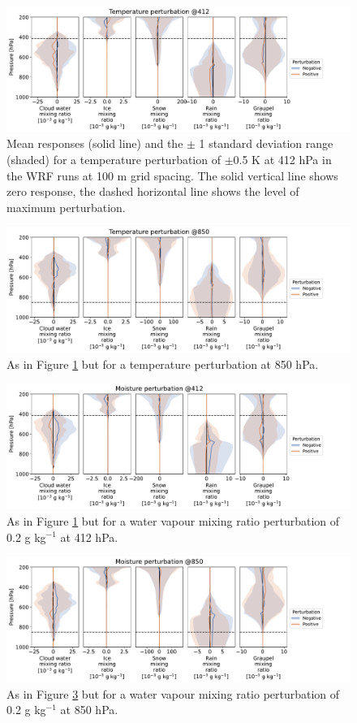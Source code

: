 \documentclass[draft]{agujournal2019}
\begin{document}
\begin{figure}[pth]
    \noindent\includegraphics[width=\textwidth]{figures/pert_var_T_0.5_@412}
    \caption{Mean responses (solid line) and the $\pm$ 1 standard deviation range (shaded) for a temperature perturbation of $\pm$0.5 K at 412 hPa in the WRF runs at 100 m grid spacing. The solid vertical line shows zero response, the dashed horizontal line shows the level of maximum perturbation.}
    \label{fig:var_T_412}
\end{figure}

\begin{figure}[pth]
    \noindent\includegraphics[width=\textwidth]{figures/pert_var_T_0.5_@850}
    \caption{As in Figure \ref{fig:var_T_412} but for a temperature perturbation at 850 hPa.}
    \label{fig:var_T_850}
\end{figure}

\begin{figure}[pth]
    \noindent\includegraphics[width=\textwidth]{figures/pert_var_q_0.0002_@412}
    \caption{As in Figure \ref{fig:var_T_412} but for a water vapour mixing ratio perturbation of 0.2 g kg$^{-1}$ at 412 hPa.}
    \label{fig:var_q_412}
\end{figure}

\begin{figure}[pth]
    \noindent\includegraphics[width=\textwidth]{figures/pert_var_q_0.0002_@850}
    \caption{As in Figure \ref{fig:var_q_412} but for a water vapour mixing ratio perturbation of 0.2 g kg$^{-1}$ at 850 hPa.}
    \label{fig:var_q_850}
\end{figure}
\end{document}

